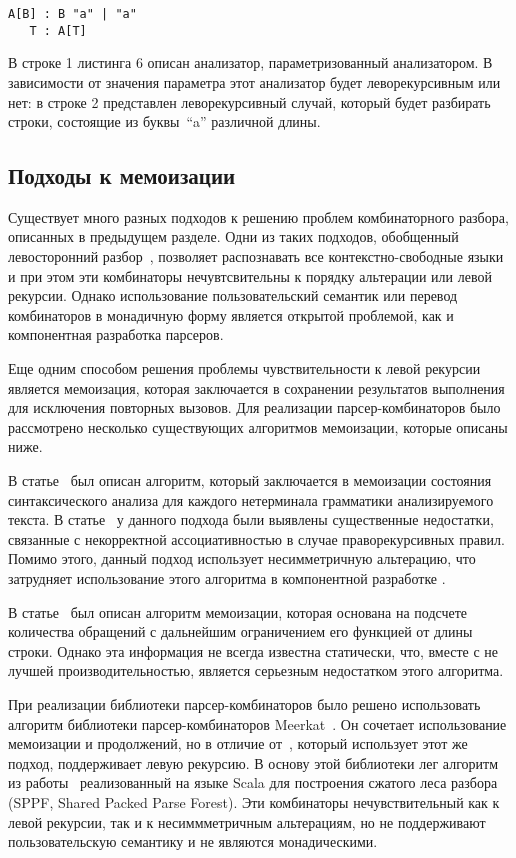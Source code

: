 \begin{lstlisting}[basicstyle=\small, caption=Левая рекурсия]
   A[B] : B "a" | "a"
   T : A[T]
\end{lstlisting}

В строке 1 листинга 6 описан анализатор, параметризованный анализатором. В зависимости от значения параметра этот анализатор будет леворекурсивным или нет: в строке 2 представлен леворекурсивный случай, который будет разбирать строки, состоящие из буквы~``a'' различной длины.

\subsection{Подходы к мемоизации}

Существует много разных подходов к решению проблем комбинаторного разбора, описанных в предыдущем разделе. Одни из таких подходов, обобщенный левосторонний разбор~\cite{GLLcomb}, позволяет распознавать все контекстно-свободные языки и при этом эти комбинаторы нечувтсвительны к порядку альтерации или левой рекурсии. Однако использование пользовательский семантик или перевод комбинаторов в монадичную форму является открытой проблемой, как и компонентная разработка парсеров.

Еще одним способом решения проблемы чувствительности к левой рекурсии является мемоизация, которая заключается в сохранении результатов выполнения для исключения повторных вызовов. Для реализации парсер-комбинаторов было рассмотрено несколько существующих алгоритмов мемоизации, которые описаны ниже.

В статье~\cite{warth} был описан алгоритм, который заключается в мемоизации состояния синтаксического анализа для каждого нетерминала грамматики анализируемого текста. В статье~\cite{tratt} у данного подхода были выявлены существенные недостатки, связанные с некорректной ассоциативностью в случае праворекурсивных правил. Помимо этого, данный подход использует несимметричную альтерацию, что затрудняет использование этого алгоритма в компонентной разработке .

В статье~\cite{frost} был описан алгоритм мемоизации, которая основана на подсчете количества обращений с дальнейшим ограничением его функцией от длины строки. Однако эта информация не всегда известна статически, что, вместе с не лучшей производительностью, является серьезным недостатком этого алгоритма.

При реализации библиотеки парсер-комбинаторов было решено использовать алгоритм библиотеки парсер-комбинаторов Meerkat~\cite{meerkat}. Он сочетает использование мемоизации и продолжений, но в отличие от~\cite{swierstra2001combinator}, который использует этот же подход, поддерживает левую рекурсию. В основу этой библиотеки лег алгоритм из работы~\cite{memo} реализованный на языке Scala для построения сжатого леса разбора (SPPF, Shared Packed Parse Forest). Эти комбинаторы нечувствительный как к левой рекурсии, так и к несиммметричным альтерациям, но не поддерживают пользовательскую семантику и не являются монадическими.

